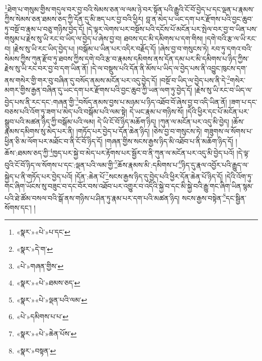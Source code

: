 \footnote{«སྣར་»«པེ་»པ་དང་}ཐེག་པ་གསུམ་གྱིས་གདུལ་བར་བྱ་བའི་སེམས་ཅན་ལ་ལམ་ཉེ་བར་སྟོན་པའི་རྒྱུའི་ངོ་བོ་བྱེད་པ་དང་ལྡན་པ་རྣམས་ཀྱིས་སེམས་ཅན་ཐམས་ཅད་ཀྱི་དོན་དུ་མི་ཟད་པར་བྱ་བའི་ཕྱིར། བླ་ན་མེད་པ་ཡང་དག་པར་རྫོགས་པའི་བྱང་ཆུབ་ཏུ་བསྔོ་བ་རྣམ་པ་བཅུ་གཉིས་བྱེད་དོ། །དེ་ལྟར་ལེགས་པར་བསྔོས་པའི་དངོས་པོ་མངོན་པར་སྤེལ་བར་བྱ་བ་ཡིན་པས་གསུམ་པ་རྗེས་སུ་ཡི་རང་བ་ཡིད་ལ་བྱེད་པ་ཞེས་བྱ་བ། ཐབས་དང་མི་དམིགས་པ་དག་གིས། །དགེ་བའི་རྩ་ལ་ཡི་རང་བ། །རྗེས་སུ་ཡི་རང་ཡིད་བྱེད་པ། །བསྒོམ་པ་ཡིན་པར་འདིར་བརྗོད་དོ། །ཞེས་བྱ་བ་གསུངས་ཏེ། རབ་ཏུ་དགའ་བའི་སེམས་ཀྱིས་ཀུན་རྫོབ་ཏུ་ཐབས་ཀྱིས་དགེ་བའི་རྩ་བ་རྣམས་དམིགས་ནས་དོན་དམ་པར་མི་དམིགས་པ་ཉིད་ཀྱིས་རྗེས་སུ་ཡི་རང་བར་བྱ་བ་དག་ཡིན་ནོ། །དེ་ལ་བསྡུས་པའི་དོན་ནི་མོས་པ་ཡིད་ལ་བྱེད་པས་ནི་འབྱུང་ཁུངས་དག་ནས་གསེར་གྱི་གར་བུ་བཞིན་དུ་བསོད་ནམས་མངོན་པར་འདུ་བྱེད་དོ། །བསྔོ་བ་ཡིད་ལ་བྱེད་པས་ནི་དེ་\footnote{«སྣར་»དེ་ག་}གསེར་མགར་གྱིས་རྒྱན་བཞིན་དུ་ཡང་དག་པར་རྫོགས་པའི་བྱང་ཆུབ་ཀྱི་ཡན་ལག་ཏུ་བྱེད་དོ། །རྗེས་སུ་ཡི་རང་བ་ཡིད་ལ་བྱེད་པས་ནི་རང་དང་:གཞན་གྱི་\footnote{«པེ་»གཞན་གྱིས་}བསོད་ནམས་བྱས་པ་མཉམ་པ་ཉིད་འཐོབ་བོ་ཞེས་བྱ་བ་འདི་ཡིན་ནོ། །ཟག་པ་དང་བཅས་པའི་འོག་ཏུ་ཟག་པ་མེད་པའི་བསྒོམ་པའི་ལམ་སྟེ། དེ་ཡང་རྣམ་པ་གཉིས་སོ། །དེའི་ཕྱིར་དང་པོ་མངོན་པར་སྒྲུབ་པའི་མཚན་ཉིད་ཀྱི་བསྒོམ་པའི་ལམ། དེ་ཡི་ངོ་བོ་ཉིད་མཆོག་ཉིད། །ཀུན་ལ་མངོན་པར་འདུ་མི་བྱེད། །ཆོས་རྣམས་དམིགས་སུ་མེད་པར་ནི། །གཏོད་པར་བྱེད་པ་དོན་ཆེན་ཉིད། །ཅེས་བྱ་བ་གསུངས་ཏེ། གཟུགས་ལ་སོགས་པ་ཕྱིན་ཅི་མ་ལོག་པར་མཐོང་བ་ནི་ངོ་བོ་ཉིད་དོ། །གཞན་གྱིས་སངས་རྒྱས་ཉིད་མི་འཐོབ་པ་ནི་མཆོག་ཉིད་དོ། །ཆོས་:ཐམས་ཅད་ཀྱི་\footnote{«སྣར་»«པེ་»ཐམས་ཅད་}ཁྱད་པར་སྐྱེ་བ་མེད་པར་རྟོགས་པར་སྦྱོར་བ་ནི་ཀུན་ལ་མངོན་པར་འདུ་མི་བྱེད་པའོ། །དེ་ལྟ་བུའི་ངོ་བོ་ཉིད་ལ་སོགས་པ་དང་:ལྡན་པའི་ལམ་གྱི་\footnote{«སྣར་»«པེ་»ལྡན་པའི་ལམ་}ཆོས་རྣམས་མི་:དམིགས་པ་\footnote{«པེ་»དམིགས་པ་པ་}ཉིད་དུ་རྣལ་འབྱོར་པའི་རྒྱུད་ལ་སྐྱེད་པ་ནི་གཏོད་པར་བྱེད་པའོ། །དོན་:ཆེན་པོ་\footnote{«སྣར་»«པེ་»ཆེན་པོས་}སངས་རྒྱས་ཉིད་དུ་བྱེད་པའི་ཕྱིར་དོན་ཆེན་པོ་ཉིད་དོ། །དེའི་འོག་ཏུ་གང་ཞིག་ཡོངས་སུ་བཟུང་བ་དང་བོར་བས་འཐོབ་པར་འགྱུར་བ་འདིའི་སྐྱེ་བ་དང་མི་སྐྱེ་བའི་རྒྱུ་གང་ཞིག་ཡིན་སྙམ་པའི་ཐེ་ཚོམ་བསལ་བའི་སྒོ་ནས་གཉིས་པ་ཤིན་ཏུ་རྣམ་པར་དག་པའི་མཚན་ཉིད། སངས་རྒྱས་བསྟེན་\footnote{«སྣར་»བསྟན་}དང་སྦྱིན་སོགས་དང་། །
